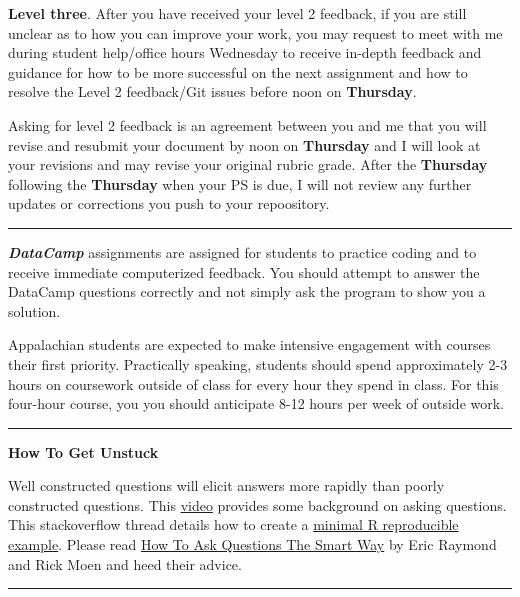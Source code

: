 \documentclass[
]{article}
\begin{document}
\textbf{Level three}. After you have received your level 2 feedback, if
you are still unclear as to how you can improve your work, you may
request to meet with me during student help/office hours Wednesday to
receive in-depth feedback and guidance for how to be more successful on
the next assignment and how to resolve the Level 2 feedback/Git issues
before noon on \textbf{Thursday}.

Asking for level 2 feedback is an agreement between you and me that you
will revise and resubmit your document by noon on \textbf{Thursday} and
I will look at your revisions and may revise your original rubric grade.
After the \textbf{Thursday} following the \textbf{Thursday} when your PS
is due, I will not review any further updates or corrections you push to
your repoository.

\begin{center}\rule{0.5\linewidth}{0.5pt}\end{center}

\textbf{\emph{DataCamp}} assignments are assigned for students to
practice coding and to receive immediate computerized feedback. You
should attempt to answer the DataCamp questions correctly and not simply
ask the program to show you a solution.

Appalachian students are expected to make intensive engagement with
courses their first priority. Practically speaking, students should
spend approximately 2-3 hours on coursework outside of class for every
hour they spend in class. For this four-hour course, you you should
anticipate 8-12 hours per week of outside work.

\begin{center}\rule{0.5\linewidth}{0.5pt}\end{center}

\textbf{How To Get Unstuck}

Well constructed questions will elicit answers more rapidly than poorly
constructed questions. This
\href{https://www.youtube.com/watch?v=ZFaWxxzouCY\&list=PLjTlxb-wKvXNSDfcKPFH2gzHGyjpeCZmJ\&index=3}{video}
provides some background on asking questions. This stackoverflow thread
details how to create a
\href{http://stackoverflow.com/questions/5963269/how-to-make-a-great-r-reproducible-example/5963610\#5963610}{minimal
R reproducible example}. Please read
\href{http://www.catb.org/~esr/faqs/smart-questions.html}{How To Ask
Questions The Smart Way} by Eric Raymond and Rick Moen and heed their
advice.

\begin{center}\rule{0.5\linewidth}{0.5pt}\end{center}
\end{document}
